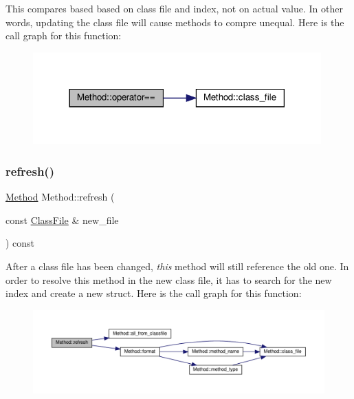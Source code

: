 This compares based based on class file and index, not on actual value. In other words, updating the class file will cause methods to compre unequal. Here is the call graph for this function\+:\nopagebreak
\begin{figure}[H]
\begin{center}
\leavevmode
\includegraphics[width=314pt]{classMethod_afa02f09f3037782d08463433465181b6_cgraph}
\end{center}
\end{figure}
\mbox{\label{classMethod_ac6a47d5797a62c5ffbb39df54ff7171d}} 
\subsubsection{\texorpdfstring{refresh()}{refresh()}}
{\footnotesize\ttfamily \hyperlink{classMethod}{Method} Method\+::refresh (\begin{DoxyParamCaption}\item[{const \hyperlink{classfile_8h_a00b46b60bc40e813e9fb1bb049174346}{Class\+File} \&}]{new\+\_\+file }\end{DoxyParamCaption}) const}

After a class file has been changed, {\itshape this} method will still reference the old one. In order to resolve this method in the new class file, it has to search for the new index and create a new struct. Here is the call graph for this function\+:\nopagebreak
\begin{figure}[H]
\begin{center}
\leavevmode
\includegraphics[width=350pt]{classMethod_ac6a47d5797a62c5ffbb39df54ff7171d_cgraph}
\end{center}
\end{figure}
\mbox{\label{classMethod_a52e769352ce657232db3a1b936e930b1}} 
